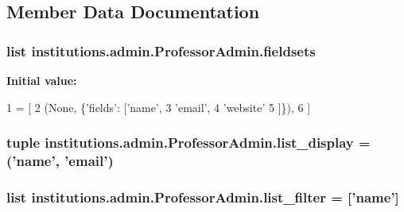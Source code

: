 \subsection{Member Data Documentation}
\hypertarget{classinstitutions_1_1admin_1_1_professor_admin_ab8a36b5a7c915b445a01b0213419f7b1}{
\subsubsection[{fieldsets}]{\setlength{\rightskip}{0pt plus 5cm}list institutions.\-admin.\-Professor\-Admin.\-fieldsets\hspace{0.3cm}{\ttfamily [static]}}}\label{classinstitutions_1_1admin_1_1_professor_admin_ab8a36b5a7c915b445a01b0213419f7b1}
{\bfseries Initial value\-:}
\begin{DoxyCode}
1 = [
2         (\textcolor{keywordtype}{None}, \{\textcolor{stringliteral}{'fields'}: [\textcolor{stringliteral}{'name'},
3                            \textcolor{stringliteral}{'email'},
4                            \textcolor{stringliteral}{'website'}
5         ]\}),
6     ]
\end{DoxyCode}
\hypertarget{classinstitutions_1_1admin_1_1_professor_admin_a1e05c20cab9819334f788a443b44c9ac}{
\subsubsection[{list\-\_\-display}]{\setlength{\rightskip}{0pt plus 5cm}tuple institutions.\-admin.\-Professor\-Admin.\-list\-\_\-display = ('name', 'email')\hspace{0.3cm}{\ttfamily [static]}}}\label{classinstitutions_1_1admin_1_1_professor_admin_a1e05c20cab9819334f788a443b44c9ac}
\hypertarget{classinstitutions_1_1admin_1_1_professor_admin_a5bd32c5a1ddf6aff67d94dc82acb52f4}{
\subsubsection[{list\-\_\-filter}]{\setlength{\rightskip}{0pt plus 5cm}list institutions.\-admin.\-Professor\-Admin.\-list\-\_\-filter = \mbox{[}'name'\mbox{]}\hspace{0.3cm}{\ttfamily [static]}}}\label{classinstitutions_1_1admin_1_1_professor_admin_a5bd32c5a1ddf6aff67d94dc82acb52f4}

